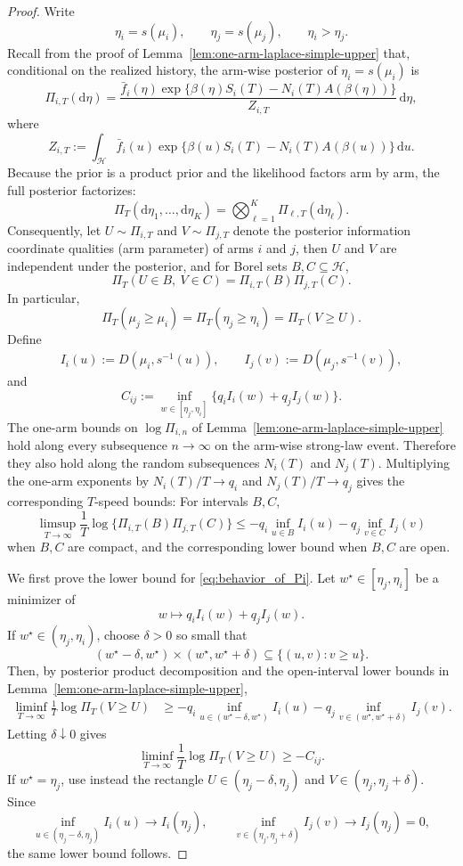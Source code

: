 \documentclass[10pt]{article}
\newcommand{\dd}{\mathrm{d}}
\theoremstyle{plain}
\begin{document}
\begin{proof}
Write
\[
    \eta_i=s(\mu_i),
    \qquad
    \eta_j=s(\mu_j),
    \qquad
    \eta_i>\eta_j.
\]
Recall from the proof of Lemma~\ref{lem:one-arm-laplace-simple-upper} that,
conditional on the realized history, the arm-wise posterior of
\(\eta_i=s(\mu_i)\) is
\[
    \varPi_{i,T}(\dd\eta)
    =
    \frac{
        \bar f_i(\eta)
        \exp\{\beta(\eta)S_i(T)-N_i(T)A(\beta(\eta))\}
    }{
        Z_{i,T}
    }\,\dd\eta,
\]
where
\[
    Z_{i,T}
    :=
    \int_{\mathcal H}
        \bar f_i(u)
        \exp\{\beta(u)S_i(T)-N_i(T)A(\beta(u))\}
    \,\dd u .
\]
Because the prior is a product prior and the likelihood factors arm by arm, the
full posterior factorizes:
\[
    \varPi_T(\dd\eta_1,\ldots,\dd\eta_K)
    =
    \bigotimes_{\ell=1}^K \varPi_{\ell,T}(\dd\eta_\ell).
\]
Consequently, let \(U\sim\varPi_{i,T}\) and \(V\sim\varPi_{j,T}\) denote the posterior
information coordinate qualities (arm parameter) of arms \(i\) and \(j\), then \(U\) and \(V\)
are independent under the posterior, and for Borel sets \(B,C\subseteq\mathcal H\),
\[
    \varPi_T(U\in B,\ V\in C)
    =
    \varPi_{i,T}(B)\varPi_{j,T}(C).
\]
In particular,
\[
    \varPi_T(\mu_j\ge \mu_i)
    =
    \varPi_T(\eta_j\ge \eta_i)
    =
    \varPi_T(V\ge U).
\]
Define
\[
    I_i(u):=D(\mu_i,s^{-1}(u)),
    \qquad
    I_j(v):=D(\mu_j,s^{-1}(v)),
\]
and
\[
    C_{ij}
    :=
    \inf_{w\in[\eta_j,\eta_i]}
    \{q_iI_i(w)+q_jI_j(w)\}.
\]
The one-arm bounds on $\log \varPi_{i,n}$ of Lemma~\ref{lem:one-arm-laplace-simple-upper} hold
along every subsequence \(n\to\infty\) on the arm-wise strong-law event.
Therefore they also hold along the random subsequences
\(N_i(T)\) and \(N_j(T)\).  Multiplying the one-arm exponents by
\(N_i(T)/T\to q_i\) and \(N_j(T)/T\to q_j\) gives the corresponding
\(T\)-speed bounds: For intervals \(B,C\),
\[
\limsup_{T\to\infty}
\frac1T\log\{\varPi_{i,T}(B)\varPi_{j,T}(C)\}
\le
-q_i\inf_{u\in B}I_i(u)-q_j\inf_{v\in C}I_j(v)
\]
when \(B,C\) are compact, and the corresponding lower bound when \(B,C\) are
open.

We first prove the lower bound for \eqref{eq:behavior_of_Pi}.  Let \(w^\star\in[\eta_j,\eta_i]\) be a minimizer of
\[
    w\mapsto q_iI_i(w)+q_jI_j(w).
\]
If \(w^\star\in(\eta_j,\eta_i)\), choose \(\delta>0\) so small that
\[
    (w^\star-\delta,w^\star)
    \times
    (w^\star,w^\star+\delta)
    \subseteq
    \{(u,v):v\ge u\}.
\]
Then, by posterior product decomposition and the open-interval lower bounds in
Lemma~\ref{lem:one-arm-laplace-simple-upper},
\[
\begin{aligned}
    \liminf_{T\to\infty}
    \frac1T\log \varPi_T(V\ge U)
    &\ge
    -q_i\inf_{u\in(w^\star-\delta,w^\star)}I_i(u)
    -q_j\inf_{v\in(w^\star,w^\star+\delta)}I_j(v).
\end{aligned}
\]
Letting \(\delta\downarrow0\) gives
\[
    \liminf_{T\to\infty}
    \frac1T\log \varPi_T(V\ge U)
    \ge
    -C_{ij}.
\]
If \(w^\star=\eta_j\), use instead the rectangle $U\in(\eta_j-\delta,\eta_j)$ and $V\in(\eta_j,\eta_j+\delta)$.
Since
\[
    \inf_{u\in(\eta_j-\delta,\eta_j)} I_i(u)\to I_i(\eta_j),
    \qquad
    \inf_{v\in(\eta_j,\eta_j+\delta)} I_j(v)\to I_j(\eta_j)=0,
\]
the same lower bound follows.  


\end{proof}
\end{document}
